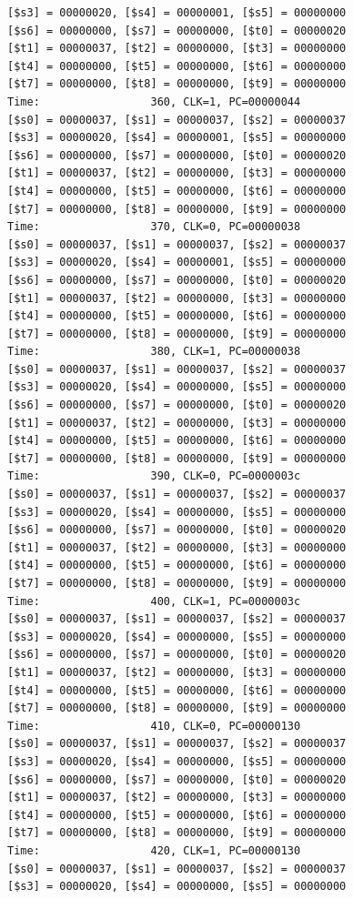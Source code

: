 \documentclass[a4paper,12pt]{article}
\begin{document}
\begin{lstlisting}
[$s3] = 00000020, [$s4] = 00000001, [$s5] = 00000000
[$s6] = 00000000, [$s7] = 00000000, [$t0] = 00000020
[$t1] = 00000037, [$t2] = 00000000, [$t3] = 00000000
[$t4] = 00000000, [$t5] = 00000000, [$t6] = 00000000
[$t7] = 00000000, [$t8] = 00000000, [$t9] = 00000000
Time:                 360, CLK=1, PC=00000044
[$s0] = 00000037, [$s1] = 00000037, [$s2] = 00000037
[$s3] = 00000020, [$s4] = 00000001, [$s5] = 00000000
[$s6] = 00000000, [$s7] = 00000000, [$t0] = 00000020
[$t1] = 00000037, [$t2] = 00000000, [$t3] = 00000000
[$t4] = 00000000, [$t5] = 00000000, [$t6] = 00000000
[$t7] = 00000000, [$t8] = 00000000, [$t9] = 00000000
Time:                 370, CLK=0, PC=00000038
[$s0] = 00000037, [$s1] = 00000037, [$s2] = 00000037
[$s3] = 00000020, [$s4] = 00000001, [$s5] = 00000000
[$s6] = 00000000, [$s7] = 00000000, [$t0] = 00000020
[$t1] = 00000037, [$t2] = 00000000, [$t3] = 00000000
[$t4] = 00000000, [$t5] = 00000000, [$t6] = 00000000
[$t7] = 00000000, [$t8] = 00000000, [$t9] = 00000000
Time:                 380, CLK=1, PC=00000038
[$s0] = 00000037, [$s1] = 00000037, [$s2] = 00000037
[$s3] = 00000020, [$s4] = 00000000, [$s5] = 00000000
[$s6] = 00000000, [$s7] = 00000000, [$t0] = 00000020
[$t1] = 00000037, [$t2] = 00000000, [$t3] = 00000000
[$t4] = 00000000, [$t5] = 00000000, [$t6] = 00000000
[$t7] = 00000000, [$t8] = 00000000, [$t9] = 00000000
Time:                 390, CLK=0, PC=0000003c
[$s0] = 00000037, [$s1] = 00000037, [$s2] = 00000037
[$s3] = 00000020, [$s4] = 00000000, [$s5] = 00000000
[$s6] = 00000000, [$s7] = 00000000, [$t0] = 00000020
[$t1] = 00000037, [$t2] = 00000000, [$t3] = 00000000
[$t4] = 00000000, [$t5] = 00000000, [$t6] = 00000000
[$t7] = 00000000, [$t8] = 00000000, [$t9] = 00000000
Time:                 400, CLK=1, PC=0000003c
[$s0] = 00000037, [$s1] = 00000037, [$s2] = 00000037
[$s3] = 00000020, [$s4] = 00000000, [$s5] = 00000000
[$s6] = 00000000, [$s7] = 00000000, [$t0] = 00000020
[$t1] = 00000037, [$t2] = 00000000, [$t3] = 00000000
[$t4] = 00000000, [$t5] = 00000000, [$t6] = 00000000
[$t7] = 00000000, [$t8] = 00000000, [$t9] = 00000000
Time:                 410, CLK=0, PC=00000130
[$s0] = 00000037, [$s1] = 00000037, [$s2] = 00000037
[$s3] = 00000020, [$s4] = 00000000, [$s5] = 00000000
[$s6] = 00000000, [$s7] = 00000000, [$t0] = 00000020
[$t1] = 00000037, [$t2] = 00000000, [$t3] = 00000000
[$t4] = 00000000, [$t5] = 00000000, [$t6] = 00000000
[$t7] = 00000000, [$t8] = 00000000, [$t9] = 00000000
Time:                 420, CLK=1, PC=00000130
[$s0] = 00000037, [$s1] = 00000037, [$s2] = 00000037
[$s3] = 00000020, [$s4] = 00000000, [$s5] = 00000000

\end{lstlisting}
\end{document}
